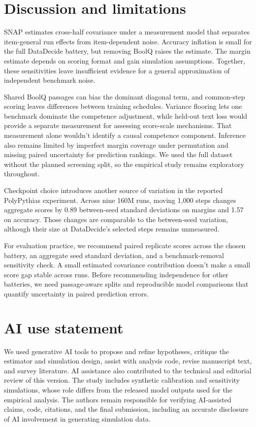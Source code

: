 \documentclass{article}
\begin{document}
\section{Discussion and limitations}
SNAP estimates cross-half covariance under a measurement model that separates item-general run effects from item-dependent noise. Accuracy inflation is small for the full DataDecide battery, but removing BoolQ raises the estimate. The margin estimate depends on scoring format and gain simulation assumptions. Together, these sensitivities leave insufficient evidence for a general approximation of independent benchmark noise.

Shared BoolQ passages can bias the dominant diagonal term, and common-step scoring leaves differences between training schedules. Variance flooring lets one benchmark dominate the competence adjustment, while held-out text loss would provide a separate measurement for assessing score-scale mechanisms. That measurement alone wouldn't identify a causal competence component. Inference also remains limited by imperfect margin coverage under permutation and missing paired uncertainty for prediction rankings. We used the full dataset without the planned screening split, so the empirical study remains exploratory throughout.

Checkpoint choice introduces another source of variation in the reported PolyPythias experiment. Across nine 160M runs, moving 1,000 steps changes aggregate scores by 0.89 between-seed standard deviations on margins and 1.57 on accuracy. Those changes are comparable to the between-seed variation, although their size at DataDecide's selected steps remains unmeasured.

For evaluation practice, we recommend paired replicate scores across the chosen battery, an aggregate seed standard deviation, and a benchmark-removal sensitivity check. A small estimated covariance contribution doesn't make a small score gap stable across runs. Before recommending independence for other batteries, we need passage-aware splits and reproducible model comparisons that quantify uncertainty in paired prediction errors.

\label{maintext:end}
\section*{AI use statement}
We used generative AI tools to propose and refine hypotheses, critique the estimator and simulation design, assist with analysis code, revise manuscript text, and survey literature. AI assistance also contributed to the technical and editorial review of this version. The study includes synthetic calibration and sensitivity simulations, whose role differs from the released model outputs used for the empirical analysis. The authors remain responsible for verifying AI-assisted claims, code, citations, and the final submission, including an accurate disclosure of AI involvement in generating simulation data.
\end{document}
